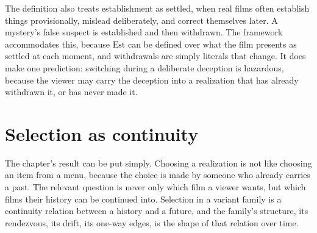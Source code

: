 The definition also treats establishment as settled, when real films often establish things provisionally, mislead deliberately, and correct themselves later. A mystery's false suspect is established and then withdrawn. The framework accommodates this, because $\mathrm{Est}$ can be defined over what the film presents as settled at each moment, and withdrawals are simply literals that change. It does make one prediction: switching during a deliberate deception is hazardous, because the viewer may carry the deception into a realization that has already withdrawn it, or has never made it.

\section{Selection as continuity}

The chapter's result can be put simply. Choosing a realization is not like choosing an item from a menu, because the choice is made by someone who already carries a past. The relevant question is never only which film a viewer wants, but which films their history can be continued into. Selection in a variant family is a continuity relation between a history and a future, and the family's structure, its rendezvous, its drift, its one-way edges, is the shape of that relation over time.
